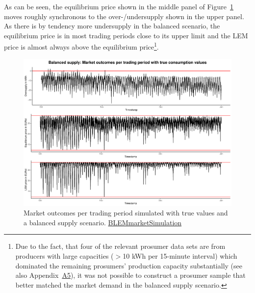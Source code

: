 As can be seen, the equilibrium price shown in the middle panel of Figure~\ref{Fig:marketoutcomes_true_balanced} moves roughly synchronous to the over-/undersupply shown in the upper panel. As there is by tendency more undersupply in the balanced scenario, the equilibrium price is in most trading periods close to its upper limit and the LEM price is almost always above the equilibrium price\footnote{Due to the fact, that four of the relevant prosumer data sets are from producers with large capacities ($>$10 kWh per 15-minute interval) which dominated the remaining prosumers' production capacity substantially (see also Appendix~\hyperlink{AppA5:Figures:producer_all}{A5}), it was not possible to construct a prosumer sample that better matched the market demand in the balanced supply scenario.}.
%
\begin{figure}[htbp]
    \centering
    \includegraphics[width=\textwidth]{thesis/graphs/marketsimulation/marketoutcome_true.pdf}
    \caption[Market outcomes simulated with balanced supply and true values]{Market outcomes per trading period simulated with true values and a balanced supply scenario. \quantnet\href{}{BLEMmarketSimulation}}
    \label{Fig:marketoutcomes_true_balanced}
\end{figure}
%

